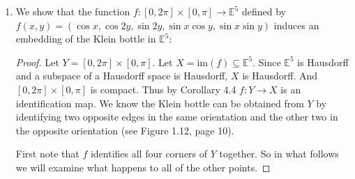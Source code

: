 \documentclass{book}
\begin{document}
\begin{enumerate}[(1)]
\begin{proof}
            \par\underline{case 2}: $x_1^2-y_1^2=0$.\\

            \par Suppose $x_1=0$.  Then $y_1=0$, and combining (1) and (2) it follows that $x_2=0$ and $y_2=0$.  Now if $x_1=y_1=0$ then necessarily $z_1=\pm 1$.  Likewise $z_2=\pm1$.  Thus in this case either $(x_1,y_1,z_1)=(x_2,y_2,z_2)$ or $(x_1,y_1,z_1)=(-x_1,-y_1,-z_1)$.  By symmetry, the same thing happens if $y_1=0$, $x_2=0$ or $y_2=0$.\\

            \par Therefore we have reduced to the case that none of $x_1,x_2,y_1,y_2$ are zero.  By assumption $x_1=\pm y_1$ and from (1) it follows that $x_2=\pm y_2$. It then follows from (2) that $x_1=\pm x_2$.\\

            {\it case a:}  $x_1=x_2$.  Then (2) implies $y_1=y_2$ and (4) implies $z_1=z_2$.  Thus $(x_1,y_1,z_1)=(x_2,y_2,z_2)$.\\

            {\it case b:}  $x_1=-x_2$.   Then (2) implies $y_1=-y_2$ and (4) implies $z_1=-z_2$.  Thus $(x_1,y_1,z_1)=(-x_2,-y_2,-z_2)$.
        \end{proof}

    \item We show that the function $f:[0,2\pi]\times[0,\pi]\rightarrow\mathbb E^5$ defined by $f(x,y)=(\cos x, \cos 2y, \sin 2y, \sin x \cos y, \sin x \sin y)$ induces an embedding of the Klein bottle in $\mathbb E^5$: 
        \begin{proof} Let $Y=[0,2\pi]\times[0,\pi]$.
            Let $X=\text{im}(f)\subseteq\mathbb E^5$.  Since $\mathbb E^5$ is Hausdorff and a subspace of a Hausdorff space is Hausdorff, $X$ is Hausdorff.  And $[0,2\pi]\times[0,\pi]$ is compact.  Thus by Corollary 4.4 $f:Y\rightarrow X$ is an identification map. We know the Klein bottle can be obtained from $Y$ by identifying two opposite edges in the same orientation and the other two in the opposite orientation (see Figure 1.12, page 10).

            \par First note that $f$ identifies all four corners of $Y$ together.  So in what follows we will examine what happens to all of the other points.


\end{proof}
\end{enumerate}
\end{document}
